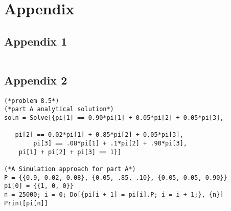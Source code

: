 \documentclass[11pt,letterpaper]{article}
\begin{document}
\newpage
\section*{Appendix}


\subsection*{Appendix 1}

\begin{verbatim}

\end{verbatim}






\subsection*{Appendix 2}
\begin{verbatim}
(*problem 8.5*)
(*part A analytical solution*)
soln = Solve[{pi[1] == 0.90*pi[1] + 0.05*pi[2] + 0.05*pi[3],
                          
   pi[2] == 0.02*pi[1] + 0.85*pi[2] + 0.05*pi[3],
   		pi[3] == .08*pi[1] + .1*pi[2] + .90*pi[3],
    pi[1] + pi[2] + pi[3] == 1}]
    
(*A Simulation approach for part A*)
P = {{0.9, 0.02, 0.08}, {0.05, .85, .10}, {0.05, 0.05, 0.90}}
pi[0] = {{1, 0, 0}}
n = 25000; i = 0; Do[{pi[i + 1] = pi[i].P; i = i + 1;}, {n}]
Print[pi[n]]

\end{verbatim}
\end{document}
